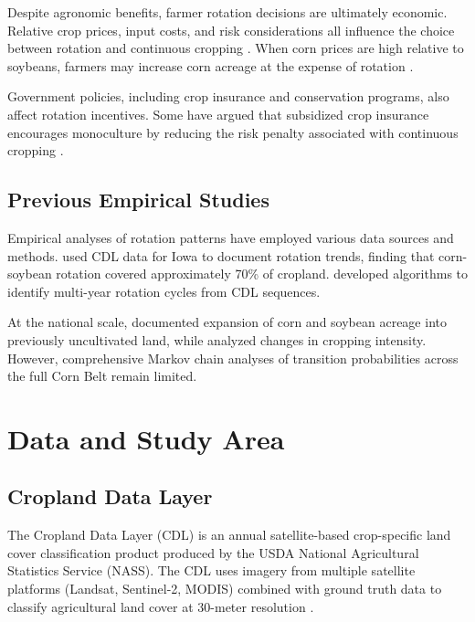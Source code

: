 \documentclass[12pt, a4paper]{article}
\begin{document}
Despite agronomic benefits, farmer rotation decisions are ultimately economic. Relative crop prices, input costs, and risk considerations all influence the choice between rotation and continuous cropping \citep{hennessy2006monoculture}. When corn prices are high relative to soybeans, farmers may increase corn acreage at the expense of rotation \citep{secchi2009impact}.

Government policies, including crop insurance and conservation programs, also affect rotation incentives. Some have argued that subsidized crop insurance encourages monoculture by reducing the risk penalty associated with continuous cropping \citep{claassen2011grassland}.

\subsection{Previous Empirical Studies}

Empirical analyses of rotation patterns have employed various data sources and methods. \citet{plourde2013evidence} used CDL data for Iowa to document rotation trends, finding that corn-soybean rotation covered approximately 70\% of cropland. \citet{sahajpal2014identifying} developed algorithms to identify multi-year rotation cycles from CDL sequences.

At the national scale, \citet{lark2015cropland} documented expansion of corn and soybean acreage into previously uncultivated land, while \citet{wright2013recent} analyzed changes in cropping intensity. However, comprehensive Markov chain analyses of transition probabilities across the full Corn Belt remain limited.


\section{Data and Study Area}
\label{sec:data}

\subsection{Cropland Data Layer}

The Cropland Data Layer (CDL) is an annual satellite-based crop-specific land cover classification product produced by the USDA National Agricultural Statistics Service (NASS). The CDL uses imagery from multiple satellite platforms (Landsat, Sentinel-2, MODIS) combined with ground truth data to classify agricultural land cover at 30-meter resolution \citep{boryan2011monitoring}.
\end{document}
